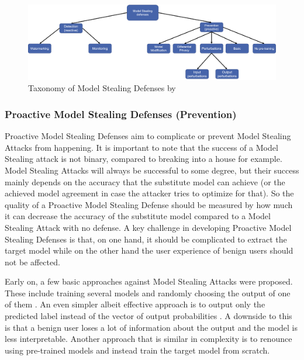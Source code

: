 \begin{figure} [ht]
    \centering
    \includegraphics[width=.9\linewidth]{images/MS_defenses_Taxonomy.png}
    \caption[Model Stealing Defenses Taxonomy]{Taxonomy of Model Stealing Defenses by \cite{oliynyk2022know}}
    \label{fig:ModelStealingDefenses:Taxonomy}
  \end{figure}

\subsubsection{Proactive Model Stealing Defenses (Prevention)}
\label{sec:ModelStealing:Defenses:Prevention}
Proactive Model Stealing Defenses aim to complicate or prevent Model Stealing Attacks from happening. It is important to note that the success of a Model Stealing attack is not binary,
compared to breaking into a house for example. Model Stealing Attacks will always be successful to some degree, but their success mainly depends on the accuracy that the substitute model
can achieve (or the achieved model agreement in case the attacker tries to optimize for that). So the quality of a Proactive Model Stealing Defense should be measured by how much it can 
decrease the accuracy of the substitute model compared to a Model Stealing Attack with no defense. A key challenge in developing Proactive Model Stealing Defenses is that, on one hand,
it should be complicated to extract the target model while on the other hand the user experience of benign users should not be affected. \par
Early on, a few basic approaches against Model Stealing Attacks were proposed. These include training several models and randomly choosing the output of one of them 
\cite{alabdulmohsin2014adding}. An even simpler albeit effective approach is to output only the predicted label instead of the vector of output probabilities \cite{tramer2016stealing}.
A downside to this is that a benign user loses a lot of information about the output and the model is less interpretable. Another approach that is similar in complexity is to renounce
using pre-trained models \cite{atli2020extraction} and instead train the target model from scratch. \par
